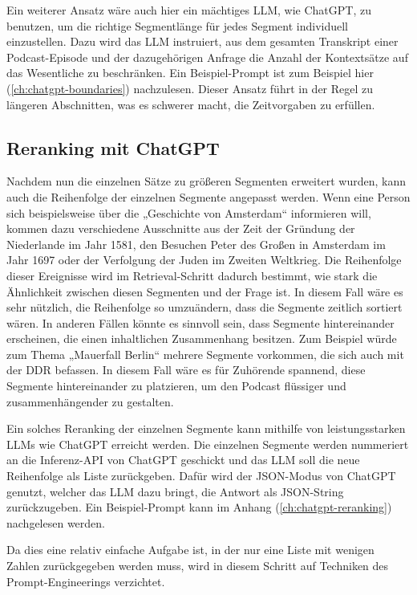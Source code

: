 Ein weiterer Ansatz wäre auch hier ein mächtiges LLM, wie ChatGPT, zu benutzen, um die richtige Segmentlänge für jedes Segment individuell einzustellen.
Dazu wird das LLM instruiert, aus dem gesamten Transkript einer Podcast-Episode und der dazugehörigen Anfrage die Anzahl der Kontextsätze auf das Wesentliche zu beschränken.
Ein Beispiel-Prompt ist zum Beispiel hier (\ref{ch:chatgpt-boundaries}) nachzulesen.
Dieser Ansatz führt in der Regel zu längeren Abschnitten, was es schwerer macht, die Zeitvorgaben zu erfüllen.

\subsection{Reranking mit ChatGPT}

Nachdem nun die einzelnen Sätze zu größeren Segmenten erweitert wurden, kann auch die Reihenfolge der einzelnen Segmente angepasst werden.
Wenn eine Person sich beispielsweise über die „Geschichte von Amsterdam“ informieren will, kommen dazu verschiedene Ausschnitte aus der Zeit der Gründung der Niederlande im Jahr 1581, den Besuchen Peter des Großen in Amsterdam im Jahr 1697 oder der Verfolgung der Juden im Zweiten Weltkrieg.
Die Reihenfolge dieser Ereignisse wird im Retrieval-Schritt dadurch bestimmt, wie stark die Ähnlichkeit zwischen diesen Segmenten und der Frage ist.
In diesem Fall wäre es sehr nützlich, die Reihenfolge so umzuändern, dass die Segmente zeitlich sortiert wären.
In anderen Fällen könnte es sinnvoll sein, dass Segmente hintereinander erscheinen, die einen inhaltlichen Zusammenhang besitzen.
Zum Beispiel würde zum Thema „Mauerfall Berlin“ mehrere Segmente vorkommen, die sich auch mit der DDR befassen.
In diesem Fall wäre es für Zuhörende spannend, diese Segmente hintereinander zu platzieren, um den Podcast flüssiger und zusammenhängender zu gestalten.

Ein solches Reranking der einzelnen Segmente kann mithilfe von leistungsstarken LLMs wie ChatGPT erreicht werden.
Die einzelnen Segmente werden nummeriert an die Inferenz-API von ChatGPT geschickt und das LLM soll die neue Reihenfolge als Liste zurückgeben.
Dafür wird der JSON-Modus von ChatGPT genutzt, welcher das LLM dazu bringt, die Antwort als JSON-String zurückzugeben.
Ein Beispiel-Prompt kann im Anhang (\ref{ch:chatgpt-reranking}) nachgelesen werden.

Da dies eine relativ einfache Aufgabe ist, in der nur eine Liste mit wenigen Zahlen zurückgegeben werden muss, wird in diesem Schritt auf Techniken des Prompt-Engineerings verzichtet.

